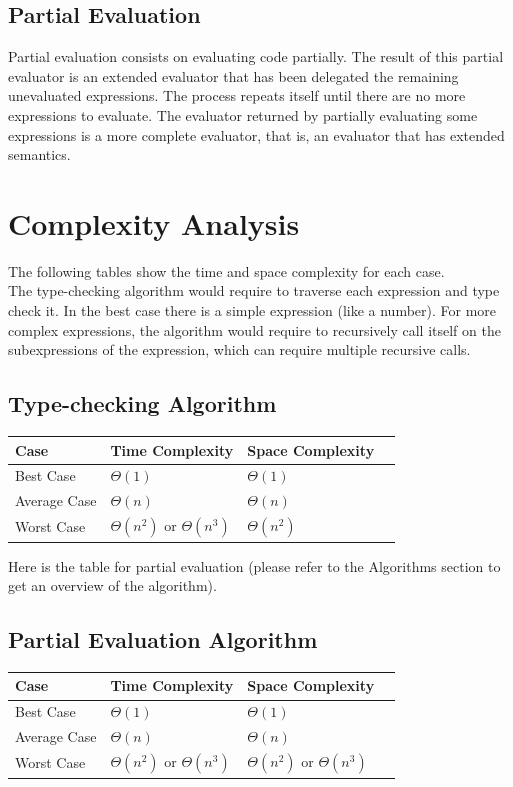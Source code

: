 \documentclass{article}
\begin{document}
\subsection*{Partial Evaluation}
Partial evaluation consists on evaluating code partially. The result of this partial evaluator is an extended evaluator that has been delegated
the remaining unevaluated expressions. The process repeats itself until there are no more expressions to evaluate. The evaluator returned by partially
evaluating some expressions is a more complete evaluator, that is, an evaluator that has extended semantics.

\section{Complexity Analysis}
The following tables show the time and space complexity for each case. \\

The type-checking algorithm would require to traverse each expression and type check it. In the best case there is a simple expression (like a number).
For more complex expressions, the algorithm would require to recursively call itself on the subexpressions of the expression, which can require multiple
recursive calls.
\subsection*{Type-checking Algorithm}
\begin{tabularx}{0.8\textwidth}{
  | >{\raggedright\arraybackslash}X
  | >{\centering\arraybackslash}X
  | >{\raggedright\arraybackslash}X
  | >{\raggedright\arraybackslash}X | }
  \hline
  Case & Time Complexity & Space Complexity \\
  \hline
  Best Case & $\Theta(1)$ & $\Theta(1)$ \\
  \hline
  Average Case & $\Theta(n)$ & $\Theta(n)$ \\
  \hline
  Worst Case & $\Theta(n^2)$ or $\Theta(n^3)$ & $\Theta(n^2)$ \\
  \hline
\end{tabularx}

Here is the table for partial evaluation (please refer to the Algorithms section to get an overview of the algorithm).
\subsection*{Partial Evaluation Algorithm}
\begin{tabularx}{0.8\textwidth}{
  | >{\raggedright\arraybackslash}X
  | >{\centering\arraybackslash}X
  | >{\raggedright\arraybackslash}X
  | >{\raggedright\arraybackslash}X | }
  \hline
  Case & Time Complexity & Space Complexity \\
  \hline
  Best Case & $\Theta(1)$ & $\Theta(1)$ \\
  \hline
  Average Case & $\Theta(n)$ & $\Theta(n)$ \\
  \hline
  Worst Case & $\Theta(n^2)$ or $\Theta(n^3)$ & $\Theta(n^2)$ or $\Theta(n^3)$ \\
  \hline
\end{tabularx}
\end{document}
